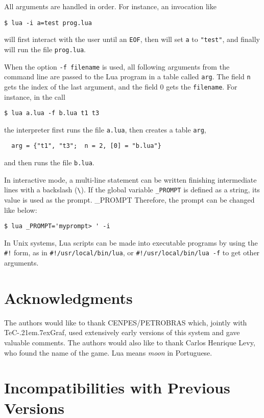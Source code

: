 \documentclass[11pt]{article}
\newcommand{\T}[1]{{\tt #1}}
\def\tecgraf{{\sf TeC\kern-.21em\lower.7ex\hbox{Graf}}}
\newcommand{\Index}[1]{#1\index{#1}}
\begin{document}
All arguments are handled in order.
For instance, an invocation like
\begin{verbatim}
$ lua -i a=test prog.lua
\end{verbatim}
will first interact with the user until an \verb|EOF|,
then will set \verb|a| to \verb|"test"|,
and finally will run the file \verb|prog.lua|.

When the option \T{-f filename} is used,
all following arguments from the command line
are passed to the Lua program in a table called \verb|arg|.
The field \verb|n| gets the index of the last argument,
and the field 0 gets the \T{filename}.
For instance, in the call
\begin{verbatim}
$ lua a.lua -f b.lua t1 t3
\end{verbatim}
the interpreter first runs the file \T{a.lua},
then creates a table \T{arg},
\begin{verbatim}
  arg = {"t1", "t3";  n = 2, [0] = "b.lua"}
\end{verbatim}
and then runs the file \T{b.lua}.

In interactive mode,
a multi-line statement can be written finishing intermediate
lines with a backslash (\verb|\|).
If the global variable \verb|_PROMPT| is defined as a string,
its value is used as the prompt. \Index{_PROMPT}
Therefore, the prompt can be changed like below:
\begin{verbatim}
$ lua _PROMPT='myprompt> ' -i
\end{verbatim}

In Unix systems, Lua scripts can be made into executable programs
by using the \verb|#!| form,
as in \verb|#!/usr/local/bin/lua|,
or \verb|#!/usr/local/bin/lua -f| to get other arguments.


\section*{Acknowledgments}

The authors would like to thank CENPES/PETROBRAS which,
jointly with \tecgraf, used extensively early versions of
this system and gave valuable comments.
The authors would also like to thank Carlos Henrique Levy,
who found the name of the game.
Lua means \emph{moon} in Portuguese.



\appendix

\section*{Incompatibilities with Previous Versions}
\end{document}
